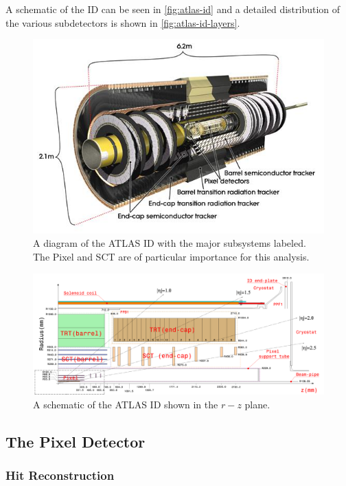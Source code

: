 A schematic of the \ac{ID} can be seen in \autoref{fig:atlas-id} and a detailed distribution of the various subdetectors is shown in \autoref{fig:atlas-id-layers}. 


\begin{figure}[htbp]
\centering
\includegraphics[width=.8\textwidth]{figures/Detector/atlas-ID.jpg}
\caption{A diagram of the \ac{ATLAS} \ac{ID} with the major subsystems labeled. The Pixel and \ac{SCT} are of particular importance for this analysis.}
\label{fig:atlas-id}
\end{figure}

\begin{figure}[htbp]
\centering
\includegraphics[width=.8\textwidth]{figures/Detector/atlas-id-layers.png}
\caption{A schematic of the \ac{ATLAS} \ac{ID} shown in the $r-z$ plane. \cite{id-cutaway}}
\label{fig:atlas-id-layers}
\end{figure}

\subsection{The Pixel Detector}
\subsubsection{Hit Reconstruction}
